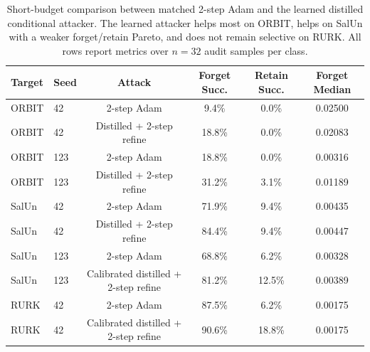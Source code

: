 \begin{table}[t]
  \centering
  \small
  \begin{tabular}{l l c c c c}
    \toprule
    Target & Seed & Attack & Forget Succ. & Retain Succ. & Forget Median \\
    \midrule
    ORBIT & 42 & 2-step Adam & 9.4\% & 0.0\% & 0.02500 \\
    ORBIT & 42 & Distilled + 2-step refine & 18.8\% & 0.0\% & 0.02083 \\
    ORBIT & 123 & 2-step Adam & 18.8\% & 0.0\% & 0.00316 \\
    ORBIT & 123 & Distilled + 2-step refine & 31.2\% & 3.1\% & 0.01189 \\
    SalUn & 42 & 2-step Adam & 71.9\% & 9.4\% & 0.00435 \\
    SalUn & 42 & Distilled + 2-step refine & 84.4\% & 9.4\% & 0.00447 \\
    SalUn & 123 & 2-step Adam & 68.8\% & 6.2\% & 0.00328 \\
    SalUn & 123 & Calibrated distilled + 2-step refine & 81.2\% & 12.5\% & 0.00389 \\
    RURK & 42 & 2-step Adam & 87.5\% & 6.2\% & 0.00175 \\
    RURK & 42 & Calibrated distilled + 2-step refine & 90.6\% & 18.8\% & 0.00175 \\
    \bottomrule
  \end{tabular}
  \caption{Short-budget comparison between matched 2-step Adam and the learned distilled conditional attacker. The learned attacker helps most on ORBIT, helps on SalUn with a weaker forget/retain Pareto, and does not remain selective on RURK. All rows report metrics over $n=32$ audit samples per class.}
  \label{tab:short-budget}
\end{table}
